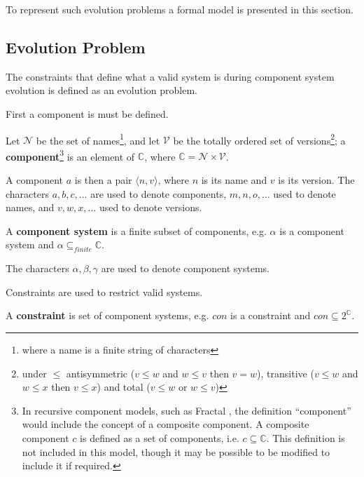 To represent such evolution problems a formal model is presented in this section. 

\subsection{Evolution Problem}
The constraints that define what a valid system is during component system evolution is defined as an evolution problem.

First a component is must be defined.
\begin{defs}
\label{formal.componentdef}
Let $\mathcal{N}$ be the set of names\footnote{where a name is a finite string of characters}, 
and let $\mathcal{V}$ be the totally ordered set of versions\footnote{under 
$\leq$ antisymmetric ($v \leq w$ and $w \leq v$ then $v = w$), transitive ($v \leq w$ and $w \leq x$ then $v \leq x$) and total ($v \leq w$ or $w \leq v$)}; 
a \textbf{component}\footnote{In recursive component models, such as Fractal \citep{Quma2006}, the definition ``component'' would include the concept of a composite component.
A composite component $c$ is defined as a set of components, i.e. $c \subseteq \mathbb{C}$.
This definition is not included in this model, though it may be possible to be modified to include it if required.} 
is an element of $\mathbb{C}$, where $\mathbb{C} = \mathcal{N} \times \mathcal{V}$. 
\end{defs}
A component $a$ is then a pair $\langle n,v \rangle$, where $n$ is its name and $v$ is its version.
The characters  $a,b,c,\ldots$ are used to denote components, $m,n,o,\ldots$ used to denote names, and $v,w,x,\ldots$ used to denote versions.

\begin{defs}
\label{formal.componentsystemdef}
A \textbf{component system} is a finite subset of components, e.g. $\alpha$ is a component system and $\alpha \subseteq_{finite} \mathbb{C}$. 
\end{defs}
The characters $\alpha,\beta,\gamma$ are used to denote component systems.

Constraints are used to restrict valid systems.
\begin{defs}
\label{formal.constraintdefs}
A \textbf{constraint} is set of component systems, e.g. $con$ is a constraint and $con \subseteq 2^{\mathbb{C}}$.
\end{defs}

